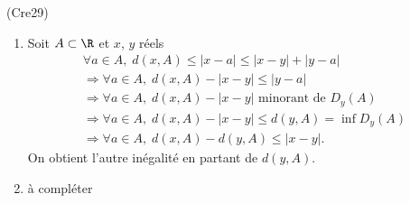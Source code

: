 \begin{tiny}(Cre29)\end{tiny}
\begin{enumerate}
  \item Soit $A\subset \R$ et $x$, $y$ réels
\begin{multline*}
\forall a \in A, \;  d(x,A) \leq |x-a| \leq |x-y| + |y-a| \\
\Rightarrow \forall a \in A, \; d(x,A) - |x-y| \leq  |y-a| \\
\Rightarrow \forall a \in A, \; d(x,A) - |x-y| \text{ minorant de } D_y(A) \\
\Rightarrow \forall a \in A, \; d(x,A) - |x-y| \leq d(y,A)= \inf D_y(A) \\
\Rightarrow \forall a \in A, \; d(x,A) - d(y,A) \leq |x-y|.
\end{multline*}
On obtient l'autre inégalité en partant de $d(y,A)$.
  \item à compléter
\end{enumerate}
